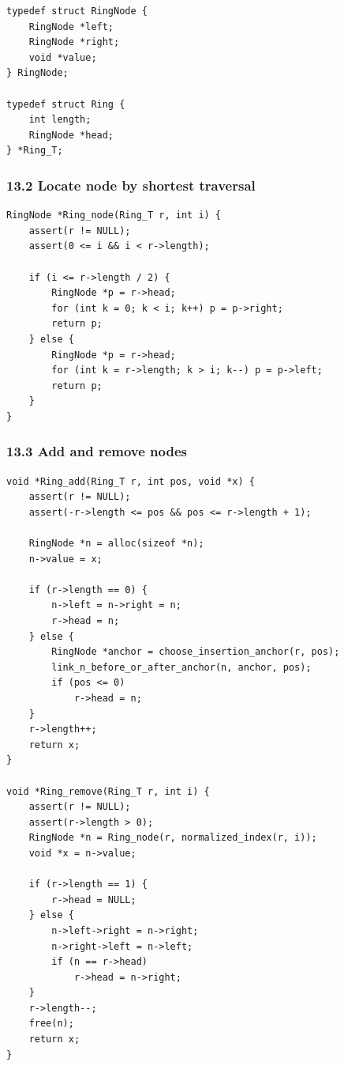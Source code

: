 \documentclass[11pt]{article}
\begin{document}
\begin{verbatim}
typedef struct RingNode {
    RingNode *left;
    RingNode *right;
    void *value;
} RingNode;

typedef struct Ring {
    int length;
    RingNode *head;
} *Ring_T;
\end{verbatim}

\subsubsection{13.2 Locate node by shortest traversal}\label{locate-node-by-shortest-traversal}

\begin{verbatim}
RingNode *Ring_node(Ring_T r, int i) {
    assert(r != NULL);
    assert(0 <= i && i < r->length);

    if (i <= r->length / 2) {
        RingNode *p = r->head;
        for (int k = 0; k < i; k++) p = p->right;
        return p;
    } else {
        RingNode *p = r->head;
        for (int k = r->length; k > i; k--) p = p->left;
        return p;
    }
}
\end{verbatim}

\subsubsection{13.3 Add and remove nodes}\label{add-and-remove-nodes}

\begin{verbatim}
void *Ring_add(Ring_T r, int pos, void *x) {
    assert(r != NULL);
    assert(-r->length <= pos && pos <= r->length + 1);

    RingNode *n = alloc(sizeof *n);
    n->value = x;

    if (r->length == 0) {
        n->left = n->right = n;
        r->head = n;
    } else {
        RingNode *anchor = choose_insertion_anchor(r, pos);
        link_n_before_or_after_anchor(n, anchor, pos);
        if (pos <= 0)
            r->head = n;
    }
    r->length++;
    return x;
}

void *Ring_remove(Ring_T r, int i) {
    assert(r != NULL);
    assert(r->length > 0);
    RingNode *n = Ring_node(r, normalized_index(r, i));
    void *x = n->value;

    if (r->length == 1) {
        r->head = NULL;
    } else {
        n->left->right = n->right;
        n->right->left = n->left;
        if (n == r->head)
            r->head = n->right;
    }
    r->length--;
    free(n);
    return x;
}
\end{verbatim}
\end{document}
